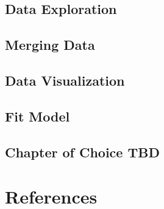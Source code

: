 \documentclass[
]{article}
\begin{document}
\hypertarget{data-exploration}{%
\subsection{Data Exploration}\label{data-exploration}}

\hypertarget{merging-data}{%
\subsection{Merging Data}\label{merging-data}}

\hypertarget{data-visualization}{%
\subsection{Data Visualization}\label{data-visualization}}

\hypertarget{fit-model}{%
\subsection{Fit Model}\label{fit-model}}

\hypertarget{chapter-of-choice-tbd}{%
\subsection{Chapter of Choice TBD}\label{chapter-of-choice-tbd}}

\hypertarget{references}{%
\section{References}\label{references}}
\end{document}

